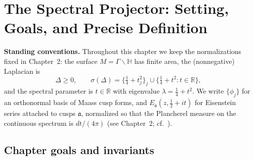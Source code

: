 
\section{The Spectral Projector: Setting, Goals, and Precise Definition}
\label{sec:proj-setting-definition}

\noindent\textbf{Standing conventions.}
Throughout this chapter we keep the normalizations fixed in Chapter~2: the surface
$M=\Gamma\backslash\mathbb{H}$ has finite area, the (nonnegative) Laplacian is
\[
  \Delta\ge 0,\qquad \sigma(\Delta)=\Big\{\tfrac14+t_j^2\Big\}_j \cup \Big\{\tfrac14+t^2: t\in\mathbb{R}\Big\},
\]
and the spectral parameter is $t\in\mathbb{R}$ with eigenvalue $\lambda=\tfrac14+t^2$.
We write $\{\phi_j\}$ for an orthonormal basis of Maass cusp forms, and
$E_{\mathfrak a}(z,\tfrac12+it)$ for Eisenstein series attached to cusps $\mathfrak a$,
normalized so that the Plancherel measure on the continuous spectrum is $dt/(4\pi)$
(see Chapter~2; cf.\ \cite{Selberg1956,Hejhal1983,Iwaniec2002}).

\subsection*{Chapter goals and invariants}

